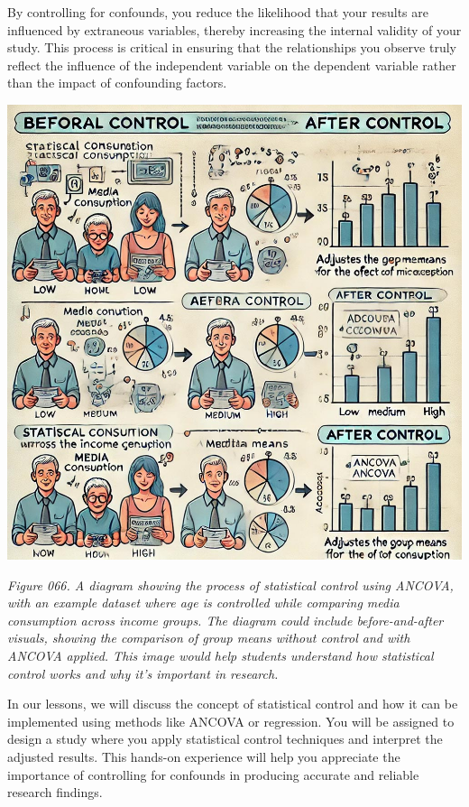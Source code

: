 \documentclass[
]{book}
\begin{document}
By controlling for confounds, you reduce the likelihood that your results are influenced by extraneous variables, thereby increasing the internal validity of your study. This process is critical in ensuring that the relationships you observe truly reflect the influence of the independent variable on the dependent variable rather than the impact of confounding factors.

\includegraphics[width=1\textwidth,height=\textheight]{images/fig066.jpg}

\emph{Figure 066. A diagram showing the process of statistical control using ANCOVA, with an example dataset where age is controlled while comparing media consumption across income groups. The diagram could include before-and-after visuals, showing the comparison of group means without control and with ANCOVA applied. This image would help students understand how statistical control works and why it's important in research.}

In our lessons, we will discuss the concept of statistical control and how it can be implemented using methods like ANCOVA or regression. You will be assigned to design a study where you apply statistical control techniques and interpret the adjusted results. This hands-on experience will help you appreciate the importance of controlling for confounds in producing accurate and reliable research findings.
\end{document}
